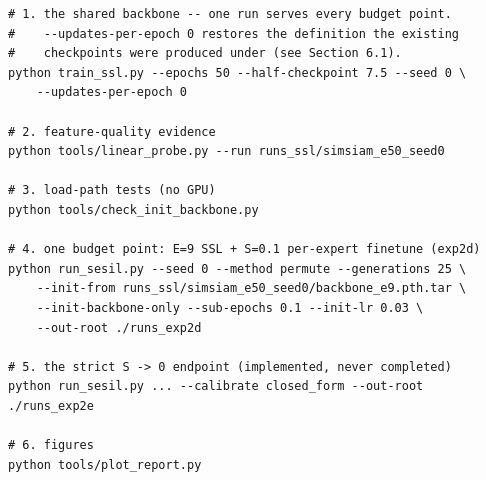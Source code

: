 \documentclass[11pt,a4paper]{article}
\begin{document}
\begin{lstlisting}
# 1. the shared backbone -- one run serves every budget point.
#    --updates-per-epoch 0 restores the definition the existing
#    checkpoints were produced under (see Section 6.1).
python train_ssl.py --epochs 50 --half-checkpoint 7.5 --seed 0 \
    --updates-per-epoch 0

# 2. feature-quality evidence
python tools/linear_probe.py --run runs_ssl/simsiam_e50_seed0

# 3. load-path tests (no GPU)
python tools/check_init_backbone.py

# 4. one budget point: E=9 SSL + S=0.1 per-expert finetune (exp2d)
python run_sesil.py --seed 0 --method permute --generations 25 \
    --init-from runs_ssl/simsiam_e50_seed0/backbone_e9.pth.tar \
    --init-backbone-only --sub-epochs 0.1 --init-lr 0.03 \
    --out-root ./runs_exp2d

# 5. the strict S -> 0 endpoint (implemented, never completed)
python run_sesil.py ... --calibrate closed_form --out-root ./runs_exp2e

# 6. figures
python tools/plot_report.py
\end{lstlisting}
\end{document}
